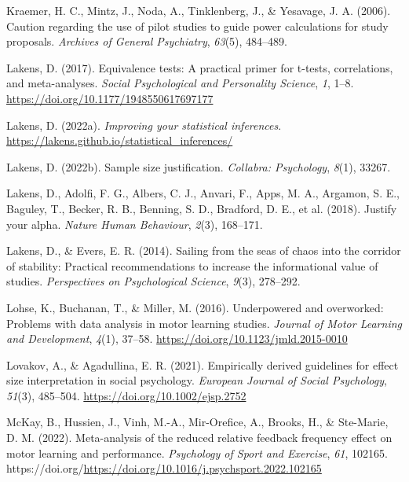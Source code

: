 \documentclass[
  man, donotrepeattitle,mask,floatsintext]{apa7}
\newlength{\cslhangindent}
\newlength{\cslentryspacingunit} %
\newenvironment{CSLReferences}[2] %
 {%
  \setlength{\parindent}{0pt}
  \ifodd #1
  \let\oldpar\par
  \def\par{\hangindent=\cslhangindent\oldpar}
  \fi
  \setlength{\parskip}{#2\cslentryspacingunit}
 }%
 {}
\begin{document}
\begin{CSLReferences}{1}{0}
\leavevmode{}%
Kraemer, H. C., Mintz, J., Noda, A., Tinklenberg, J., \& Yesavage, J. A. (2006). Caution regarding the use of pilot studies to guide power calculations for study proposals. \emph{Archives of General Psychiatry}, \emph{63}(5), 484--489.

\leavevmode{}%
Lakens, D. (2017). Equivalence tests: A practical primer for t-tests, correlations, and meta-analyses. \emph{Social Psychological and Personality Science}, \emph{1}, 1--8. \url{https://doi.org/10.1177/1948550617697177}

\leavevmode{}%
Lakens, D. (2022a). \emph{Improving your statistical inferences}. \url{https://lakens.github.io/statistical_inferences/}

\leavevmode{}%
Lakens, D. (2022b). Sample size justification. \emph{Collabra: Psychology}, \emph{8}(1), 33267.

\leavevmode{}%
Lakens, D., Adolfi, F. G., Albers, C. J., Anvari, F., Apps, M. A., Argamon, S. E., Baguley, T., Becker, R. B., Benning, S. D., Bradford, D. E., et al. (2018). Justify your alpha. \emph{Nature Human Behaviour}, \emph{2}(3), 168--171.

\leavevmode{}%
Lakens, D., \& Evers, E. R. (2014). Sailing from the seas of chaos into the corridor of stability: Practical recommendations to increase the informational value of studies. \emph{Perspectives on Psychological Science}, \emph{9}(3), 278--292.

\leavevmode{}%
Lohse, K., Buchanan, T., \& Miller, M. (2016). Underpowered and overworked: Problems with data analysis in motor learning studies. \emph{Journal of Motor Learning and Development}, \emph{4}(1), 37--58. \url{https://doi.org/10.1123/jmld.2015-0010}

\leavevmode{}%
Lovakov, A., \& Agadullina, E. R. (2021). Empirically derived guidelines for effect size interpretation in social psychology. \emph{European Journal of Social Psychology}, \emph{51}(3), 485--504. \url{https://doi.org/10.1002/ejsp.2752}

\leavevmode{}%
McKay, B., Hussien, J., Vinh, M.-A., Mir-Orefice, A., Brooks, H., \& Ste-Marie, D. M. (2022). Meta-analysis of the reduced relative feedback frequency effect on motor learning and performance. \emph{Psychology of Sport and Exercise}, \emph{61}, 102165. https://doi.org/\url{https://doi.org/10.1016/j.psychsport.2022.102165}


\end{CSLReferences}
\end{document}
